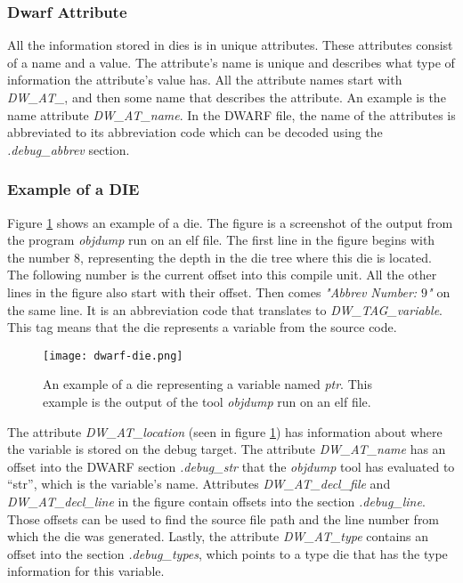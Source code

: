 \subsubsection{Dwarf Attribute}\label{sec:dwarfattributes}
All the information stored in \glspl{die} is in unique attributes.
These attributes consist of a name and a value.
The attribute's name is unique and describes what type of information the attribute's value has.
All the attribute names start with \emph{DW\_AT\_}, and then some name that describes the attribute.
An example is the name attribute \emph{DW\_AT\_name}. 
In the \gls{DWARF} file, the name of the attributes is abbreviated to its abbreviation code which can be decoded using the \emph{.debug\_abbrev} section.


\subsubsection{Example of a DIE}
Figure \ref{fig:dwarfdie} shows an example of a \gls{die}.
The figure is a screenshot of the output from the program \emph{objdump} run on an \gls{elf} file.
The first line in the figure begins with the number $8$, representing the depth in the \gls{die} tree where this \gls{die} is located.
The following number is the current offset into this compile unit.
All the other lines in the figure also start with their offset.
Then comes \emph{"Abbrev Number: $9$"} on the same line.
It is an abbreviation code that translates to \emph{DW\_TAG\_variable}.
This tag means that the \gls{die} represents a variable from the source code.


\begin{figure}[h]
	\centering
	\texttt{[image: dwarf-die.png]}
	\caption{An example of a \gls{die} representing a variable named \emph{ptr}. This example is the output of the tool \emph{objdump} run on an \gls{elf} file.}
	\label{fig:dwarfdie}
\end{figure}


The attribute \emph{DW\_AT\_location} (seen in figure \ref{fig:dwarfdie}) has information about where the variable is stored on the debug target.
The attribute \emph{DW\_AT\_name} has an offset into the \gls{DWARF} section \emph{.debug\_str} that the \emph{objdump} tool has evaluated to ``str'', which is the variable's name.
Attributes \emph{DW\_AT\_decl\_file} and \emph{DW\_AT\_decl\_line} in the figure contain offsets into the section \emph{.debug\_line}.
Those offsets can be used to find the source file path and the line number from which the \gls{die} was generated.
Lastly, the attribute \emph{DW\_AT\_type} contains an offset into the section \emph{.debug\_types}, which points to a type \gls{die} that has the type information for this variable.



